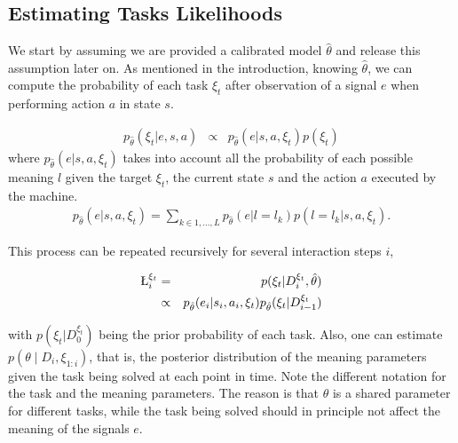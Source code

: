 


\subsection{Estimating Tasks Likelihoods}


We start by assuming we are provided a calibrated model $\hat{\theta}$ and release this assumption later on.
%
As mentioned in the introduction, knowing $\hat{\theta}$, we can compute the probability of each task $\xi_t$ after observation of a signal $e$ when performing action $a$ in state $s$.

\begin{eqnarray}
p_{\hat{\theta}}(\xi_t|e, s, a ) & \propto & p_{\hat{\theta}}(e |s, a, \xi_t) p(\xi_t)
\label{eq:1}
\end{eqnarray}
where  $p_{\hat{\theta}}(e |s, a, \xi_t)$ takes into account all the probability of each possible meaning $l$ given the target $\xi_t$, the current state $s$ and the action $a$ executed by the machine.
\begin{eqnarray}
p_{\hat{\theta}}(e |s, a,  \xi_t) =  \sum_{k \in {1, \ldots, L}} p_{\hat{\theta}}(e |l = l_k) p(l = l_k| s, a, \xi_t).
\end{eqnarray}

This process can be repeated recursively for several interaction steps $i$, 

\begin{eqnarray}
\L_i^{\xi_t} & = & p(\xi_t|D_i^{\xi_t}, \hat{\theta}) \nonumber \\
& \propto & p_{\hat{\theta}}(e_i |s_i, a_i, \xi_t) p_{ \hat{\theta}}(\xi_t|D_{i-1}^{\xi_t})
\label{eq:filter}
\end{eqnarray}

with $p(\xi_t|D_0^{\xi_t})$ being the prior probability of each task. Also, one can estimate $p(\theta \mid D_i, \xi_{1:i})$, that is, the posterior distribution of the meaning parameters given the task being solved at each point in time. Note the different notation for the task and the meaning parameters. The reason is that $\theta$ is a shared parameter for different tasks, while the task being solved should in principle not affect the meaning of the signals $e$.

